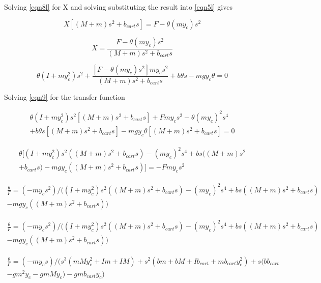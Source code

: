 \documentclass{article}
\begin{document}
Solving \ref{eqn8l} for X and solving substituting the result into \ref{eqn5l} gives

\begin{equation} 
\label{eqn8lb}
X [(M+m) s^2 + b_{cart} s]= F - \theta(m y_c) s^2
\end{equation}

\begin{equation} 
\label{eqn8lc}
X = \frac{F - \theta(m y_c) s^2}{(M+m) s^2 + b_{cart} s}
\end{equation}

\begin{equation} 
\label{eqn9}
\theta (I+m y_c^2) s^2+  \frac{[F - \theta(m y_c) s^2] m y_c s^2}{(M+m) s^2 + b_{cart} s}+b \theta s - m g y_c \theta = 0 
\end{equation}

Solving \ref{eqn9} for the transfer function

\begin{multline} 
\label{eqn9b}
\theta (I+m y_c^2) s^2 [(M+m) s^2 + b_{cart} s]+ F m y_c s^2 - \theta(m y_c)^2 s^4 \\ 
+ b \theta s [(M+m) s^2 + b_{cart} s]- m g y_c \theta [(M+m) s^2 + b_{cart} s]= 0 
\end{multline}

\begin{multline} 
\label{eqn9c}
\theta [(I+m y_c^2) s^2 ((M+m) s^2 + b_{cart} s) - (m y_c)^2 s^4 + b s ((M+m) s^2 \\+ b_{cart} s)
- m g y_c ((M+m) s^2 + b_{cart} s)] = -F m y_c s^2
\end{multline}

\begin{multline} 
\label{eqn9d}
\frac{\theta}{F} = (-m y_c s^2)/((I+m y_c^2) s^2 ((M+m) s^2 + b_{cart} s) - (m y_c)^2 s^4 + b s ((M+m) s^2 + b_{cart} s) \\
- m g y_c ((M+m) s^2 + b_{cart} s))
\end{multline}

\begin{multline} 
\label{eqn9e}
\frac{\theta}{F} = (-m y_c s^2)/((I+m y_c^2) s^2 ((M+m) s^2 + b_{cart} s) - (m y_c)^2 s^4 + b s ((M+m) s^2 + b_{cart} s) \\
- m g y_c ((M+m) s^2 + b_{cart} s))
\end{multline}

\begin{multline} 
\label{eqn9f}
\frac{\theta}{F} = (-m y_c s)/(s^3(m M y_c^2 + I m + I M) + s^2(b m + b M + I b_{cart} + m b_{cart} y_c^2) + s(b b_{cart} \\
- g m^2  y_c - g m M y_c) - g m b_{cart} y_c)
\end{multline}
\end{document}
